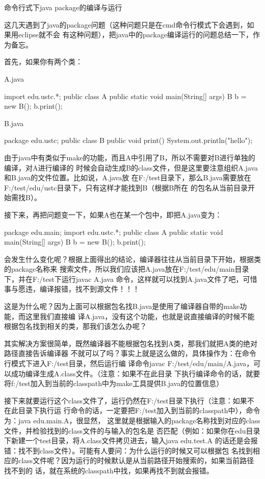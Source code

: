 命令行式下java  package的编译与运行
 	
这几天遇到了java的package问题（这种问题只是在cmd命令行模式下会遇到，如果用eclipse就不会
有这种问题），把java中的package编译运行的问题总结一下，作为备忘。

首先，如果你有两个类：

A.java
\begin{javaCode}
import edu.ustc.*;
public class A{
  public static void main(String[] args){
    B b = new B();
    b.print();
  }
}
\end{javaCode}

B.java
\begin{javaCode}  
package edu.ustc;
public class B{
  public void print(){
    System.out.println("hello");
  }
}
\end{javaCode}
由于java中有类似于make的功能，而且A中引用了B，所以不需要对B进行单独的编译，对A进行编译的
时候会自动生成B的class文件，但是这里要注意组织A.java和B.java的文件位置。比如说，A.java放
在F:/test目录下，那么B.java需要放在F:/test/edu/ustc目录下，只有这样才能找到B（根据B所在
的包名从当前目录开始需找B）。
 
接下来，再把问题变一下，如果A也在某一个包中，即把A.java变为：
\begin{javaCode}
package edu.main;
import edu.ustc.*;
public class A{
  public static void main(String[] args){
    B b = new B();
    b.print();
  }
}
\end{javaCode}

会发生什么变化呢？根据上面得出的结论，编译器往往从当前目录下开始，根据类的package名称来
搜索文件，所以我们应该把A.java放在F:/test/edu/main目录下，并在F:/test下运行javac A.java
命令，这样就可以找到A.java文件了吧，可惜事与愿违，编译报错，找不到源文件！！！

这是为什么呢？因为上面可以根据包名找B.java是使用了编译器自带的make功能，而这里我们直接编
译A.java，没有这个功能，也就是说直接编译的时候不能根据包名找到相关的类，那我们该怎么办呢？

其实解决方案很简单，既然编译器不能根据包名找到A类，那我们就把A类的绝对路径直接告诉编译器
不就可以了吗？事实上就是这么做的，具体操作为：在命令行模式下进入F:/test目录，然后运行编
译命令javac F:/test/edu/main/A.java，可以成功编译生成A.class文件。（注意：如果不在此目录
下执行编译命令的话，就要将f:/test加入到当前的classpath中为make工具提供B.java的位置信息）

接下来就要运行这个class文件了，运行仍然在F:/test目录下执行（注意：如果不在此目录下执行运
行命令的话，一定要把F:/test加入到当前的classpath中），命令为：java edu.main.A，很显然，
这里就是根据输入的package名称找到对应的class文件，并检验找到的class文件的与输入的包名是
否匹配（例如：如果你在edu目录下新建一个test目录，将A.class文件拷贝进去，输入java
edu.test.A 的话还是会报错：找不到class文件）。可能有人要问：为什么运行的时候又可以根据包
名找到相应的class文件呢？因为运行的时候默认是从当前路径开始搜索的，如果当前路径找不到的
话，就在系统的classpath中找，如果再找不到就会报错。

